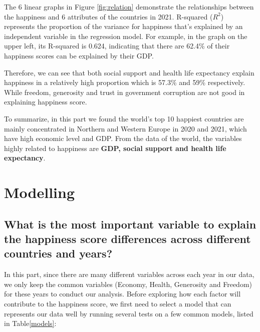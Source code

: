 \documentclass[11pt,a4paper,]{article}
\begin{document}
The 6 linear graphs in Figure \ref{fig:relation} demonstrate the relationships between the happiness and 6 attributes of the countries in 2021. R-squared (\(R^2\)) represents the proportion of the variance for happiness that's explained by an independent variable in the regression model. For example, in the graph on the upper left, its R-squared is 0.624, indicating that there are 62.4\% of their happiness scores can be explained by their GDP.

Therefore, we can see that both social support and health life expectancy explain happiness in a relatively high proportion which is 57.3\% and 59\% respectively. While freedom, generosity and trust in government corruption are not good in explaining happiness score.

To summarize, in this part we found the world's top 10 happiest countries are mainly concentrated in Northern and Western Europe in 2020 and 2021, which have high economic level and GDP. From the data of the world, the variables highly related to happiness are \textbf{GDP, social support and health life expectancy}.

\clearpage

\hypertarget{modelling}{%
\section{Modelling}\label{modelling}}

\hypertarget{what-is-the-most-important-variable-to-explain-the-happiness-score-differences-across-different-countries-and-years}{%
\subsection{What is the most important variable to explain the happiness score differences across different countries and years?}\label{what-is-the-most-important-variable-to-explain-the-happiness-score-differences-across-different-countries-and-years}}

In this part, since there are many different variables across each year in our data, we only keep the common variables (Economy, Health, Generosity and Freedom) for these years to conduct our analysis. Before exploring how each factor will contribute to the happiness score, we first need to select a model that can represents our data well by running several tests on a few common models, listed in Table\ref{models}:
\end{document}
